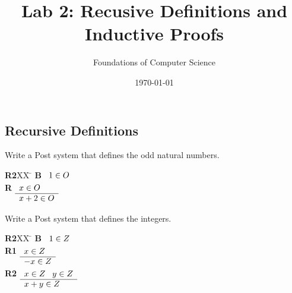 \documentclass[]{exam}
\title{Lab 2: Recusive Definitions and Inductive Proofs}
\author{Foundations of Computer Science}
\date{\today}
\theoremstyle{definition}
\begin{document}
\maketitle

\begin{questions}

\section*{Recursive Definitions}
\question Write a Post system that defines the odd natural numbers.
\begin{solution}
\begin{tabbing}
{\bf R2}XX \=  \kill
{\bf B} \>
        \(\begin{array}[t]{l}
        1\in O
        \end{array}\) \\[2ex]
{\bf R} \>
        \(\begin{array}[t]{l}
        x \in O \\
        \hline
        x + 2 \in O
        \end{array}\)
\end{tabbing}
\end{solution}

\question Write a Post system that defines the integers.
\begin{solution}
\begin{tabbing}
{\bf R2}XX \=  \kill
{\bf B} \>
        \(\begin{array}[t]{l}
        1\in Z
        \end{array}\) \\[2ex]
{\bf R1} \>
        \(\begin{array}[t]{l}
        x \in Z \\
        \hline
        -x \in Z
        \end{array}\) \\[2ex]
{\bf R2} \>
        \(\begin{array}[t]{l}
        x \in Z \;\;\;y \in Z \\
        \hline
        x + y \in Z
        \end{array}\)
\end{tabbing}
\end{solution}



\end{questions}
\end{document}
